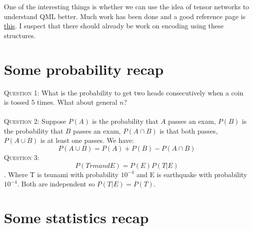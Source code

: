\documentclass[11pt]{article}
\begin{document}
One of the interesting things is whether we can use the idea of tensor networks 
to understand QML better. Much work has been done and a good reference page is 
\href{https://tensornetwork.org/ml/}{this}. I suspect that there should already be work on encoding using these structures. 




\appendix  

\section{Some probability recap} 

\textsc{Question 1:} What is the probability to get two heads consecutively when a coin is tossed 5 times. What about general $n$? \\ \\ 
\textsc{Question 2:} Suppose $P(A)$ is the probability that $A$ passes an exam, $P(B)$ is the probability that $B$ passes an exam, $P(A \cap B)$ is that both passes, $P(A \cup B)$ is at least one passes. We have: 
\[ P(A \cup B) = P(A) + P(B) - P(A \cap B) \] 
\textsc{Question 3:}  \[ P(T rm{and} E) = P(E) P(T \vert E) \]. Where T is tsunami with probability $10^{-4}$ and E is earthquake with probability $10^{-4}$. Both are independent so $P(T \vert E) = P(T)$. 




\section{Some statistics recap}
\end{document}
